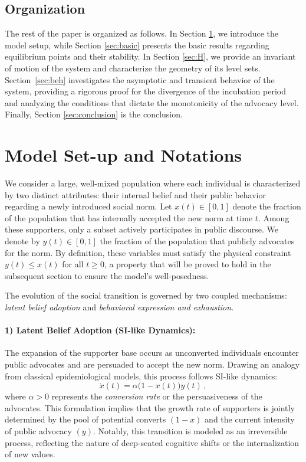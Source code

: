 \documentclass{article}
\begin{document}
\subsection{Organization}
The rest of the paper is organized as follows. In Section \ref{sec:model}, we introduce the model setup, while Section \ref{sec:basic} presents the basic results regarding equilibrium points and their stability. In Section \ref{sec:H}, we provide an invariant of motion of the system and characterize the geometry of its level sets. Section~\ref{sec:beh} investigates the asymptotic and transient behavior of the system, providing a rigorous proof for the divergence of the incubation period and analyzing the conditions that dictate the monotonicity of the advocacy level. Finally, Section \ref{sec:conclusion} is the conclusion.

\section{Model Set-up and Notations}\label{sec:model}
We consider a large, well-mixed population where each individual is characterized by two distinct attributes: their internal belief and their public behavior regarding a newly introduced social norm. Let $x(t) \in [0, 1]$ denote the fraction of the population that has internally accepted the new norm at time $t$. Among these supporters, only a subset actively participates in public discourse. We denote by $y(t) \in [0, 1]$ the fraction of the population that publicly advocates for the norm. By definition, these variables must satisfy the physical constraint $y(t) \le x(t)$ for all $t \ge 0$, a property that will be proved to hold in the subsequent section to ensure the model's well-posedness.

The evolution of the social transition is governed by two coupled mechanisms: \emph{latent belief adoption} and \emph{behavioral expression and exhaustion}.

\paragraph{1) Latent Belief Adoption (SI-like Dynamics):} 
The expansion of the supporter base occurs as unconverted individuals encounter public advocates and are persuaded to accept the new norm. Drawing an analogy from classical epidemiological models, this process follows SI-like dynamics:
\begin{equation}
    \dot{x}(t) = \alpha \big(1 - x(t)\big) y(t)\,,
    \label{equ_x}
\end{equation}
where $\alpha > 0$ represents the \textit{conversion rate} or the persuasiveness of the advocates. This formulation implies that the growth rate of supporters is jointly determined by the pool of potential converts $(1-x)$ and the current intensity of public advocacy $(y)$. Notably, this transition is modeled as an irreversible process, reflecting the nature of deep-seated cognitive shifts or the internalization of new values.
\end{document}
